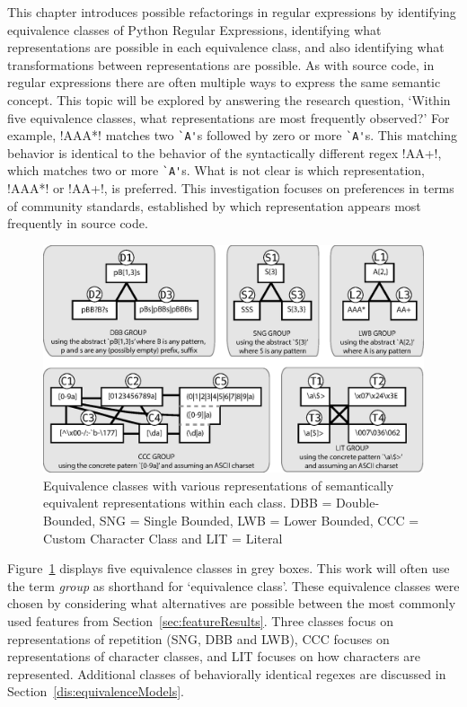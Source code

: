 \label{sec:equivClasses}

This chapter introduces possible refactorings in regular expressions by identifying equivalence classes of Python Regular Expressions, identifying what representations are possible in each equivalence class, and also identifying what transformations between representations are possible. As with source code, in regular expressions there are often multiple ways to express the same semantic concept.
This topic will be explored by answering the research question, `Within five equivalence classes, what representations are most frequently observed?'
For example, \cverb!AAA*! matches two \verb!`A'!s followed by zero or more \verb!`A'!s.  This matching behavior is identical to the behavior of the syntactically different regex \cverb!AA+!, which matches two or more \verb!`A'!s.  What is not clear is which representation,  \cverb!AAA*!  or  \cverb!AA+!, is preferred.  This investigation focuses on preferences in terms of community standards, established by which representation appears most frequently in source code.

\begin{figure}[tb]
\centering
\includegraphics[width=\textwidth]{nontex/illustrations/refactoringTree.eps}
\vspace{-12pt}
\caption{Equivalence classes with various representations of semantically equivalent representations within each class. DBB = Double-Bounded, SNG = Single Bounded, LWB = Lower Bounded, CCC = Custom Character Class and LIT = Literal}
\vspace{-6pt}
\label{fig:refactoringTree}
\end{figure}

Figure~\ref{fig:refactoringTree} displays five equivalence classes in grey boxes.  This work will often use the term \emph{group} as shorthand for `equivalence class'.  These equivalence classes were chosen by considering what alternatives are possible between the most commonly used features from  Section~\ref{sec:featureResults}.  Three classes focus on representations of repetition (SNG, DBB and LWB), CCC focuses on representations of character classes, and LIT focuses on how characters are represented.  Additional classes of behaviorally identical regexes are discussed in Section~\ref{dis:equivalenceModels}.


